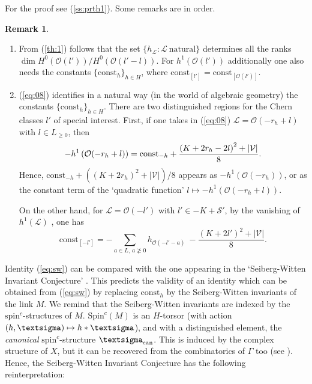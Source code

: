 \documentclass[10pt,a4paper]{amsart}
\numberwithin{equation}{section}
\numberwithin{equation}{subsection}
\theoremstyle{plain}
\theoremstyle{definition}
\newtheorem{remark}[equation]{Remark}
\begin{document}
For the proof see (\ref{ss:prth1}). Some remarks are in order.
\begin{remark}\label{re:UJ} \
\begin{enumerate}
\item\label{re:UJ1}
From (\ref{th:1}) follows that  the set
$\{h_{\mathcal{L}}:{\mathcal{L}} \ \mbox{natural}\}$ determines all
the ranks  $\dim H^0({\mathcal{O}}(l'))/H^0({\mathcal{O}}(l'-l))$. For $h^1({\mathcal{O}}(l'))$
additionally one also needs the constants
$\{\mathrm{const}_{h}\}_{h\in H}$, where
$\mathrm{const}_{[l']}=\mathrm{const}_{[{\mathcal{O}}(l')]}$.

\item\label{re:UJ2}
(\ref{eq:08}) identifies in a natural way (in the world of
algebraic geometry) the constants $\{\mathrm{const}_{h}\}_{h\in
H}$. There are two distinguished  regions for the Chern classes
$l'$ of special interest. First, if one takes  in (\ref{eq:08})
${\mathcal{L}}={\mathcal{O}}(-r_h+l)$ with $l\in L_{\geq 0}$, then
\begin{equation}\label{eq:sw}
  - h^1 \left( {\mathcal{O}}(-r_h+l)\right) =
    \mathrm{const}_{-h} +
    {\mathchoice
         \frac{{{\left(K +2 r_h-2l\right)}^2 + |{\mathcal{V}}|}}{{8}}   
  {\mathinner{{{{\left(K +2 r_h-2l\right)}^2 + |{\mathcal{V}}|}}/{{8}}}}
  {\mathinner{{{{\left(K +2 r_h-2l\right)}^2 + |{\mathcal{V}}|}}/{{8}}}}
  {\mathinner{{{{\left(K +2 r_h-2l\right)}^2 + |{\mathcal{V}}|}}/{{8}}}}
}.
\end{equation}
Hence, $\mathrm{const}_{-h}+((K+2r_h)^2+|{\mathcal{V}}|)/8$ appears as $ - h^1
\left( {\mathcal{O}}(-r_h)\right)$, or as the constant term of the
`quadratic function' $l\mapsto  - h^1 \left( {\mathcal{O}}(-r_h+l)\right)$.

On the other hand, for ${\mathcal{L}} ={\mathcal{O}}(-l')$ with $l'\in
-K+{\mathcal{S}}'$, by the vanishing of $h^1({\mathcal{L}})$  \cite[(3.2)]{Laufer72},
one has
\begin{equation}\label{eq:KV} \mathrm{const}_{[-l']}=
-\sum_{a\in L,\, a\ngeq 0} h_{{\mathcal{O}}(-l'-a)}\ -
\frac{(K+2l')^2+|{\mathcal{V}}|}{8}.\end{equation}
\end{enumerate}
\end{remark}

Identity (\ref{eq:sw}) can be compared with the one appearing in
the `Seiberg-Witten Invariant Conjecture'
\cite{nemethi02:_seiber_witten,CDGb}. This predicts the
validity of an identity which can be obtained from
(\ref{eq:sw}) by replacing $ \mathrm{const}_{h}$ by the Seiberg-Witten
invariants of the link $M$. We remind that
the Seiberg-Witten invariants are indexed by the
$\mathrm{spin}^c$-structures of $M$. $\mathrm{Spin}^c(M)$ is an
$H$-torsor (with action $(h,{\textsigma})\mapsto h*{\textsigma}$), and with a
distinguished element, the {\em canonical}
$\mathrm{spin}^c$-structure ${\textsigma}_{\mathrm{can}}$. This is
induced by the complex structure of $X$, but it can be recovered
from the combinatorics of $\Gamma$ too (see
\cite{nemethi02:_seiber_witten}). Hence, the 
Seiberg-Witten Invariant Conjecture 
\cite{nemethi02:_seiber_witten} 
has the following reinterpretation:
\end{document}
